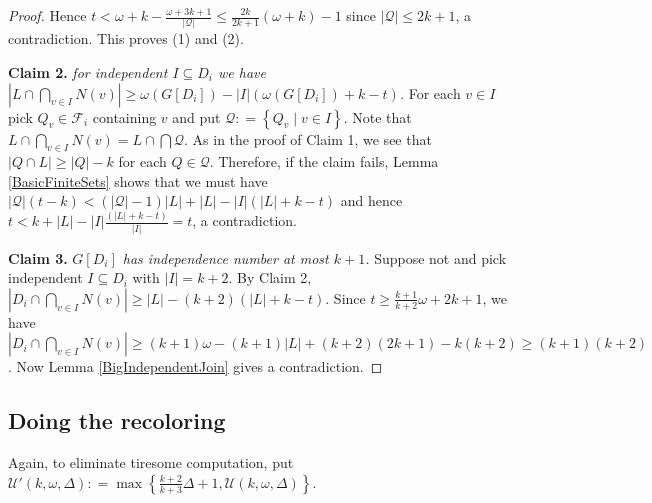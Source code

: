 \documentclass[12pt]{article}
\theoremstyle{plain}
\theoremstyle{definition}
\theoremstyle{remark}
\newcommand{\fancy}[1]{\mathcal{#1}}
\newcommand{\set}[1]{\left\{ #1 \right\}}
\newcommand{\setbs}[2]{\left\{ #1 \mid #2 \right\}}
\newcommand{\card}[1]{\left|#1\right|}
\newcommand{\DefinedAs}{\mathrel{\mathop:}=}
\begin{document}
\begin{proof}
Hence $t < \omega + k - \frac{\omega + 3k + 1}{\card{\fancy{Q}}} \leq \frac{2k}{2k+1}(\omega + k) - 1$ since $\card{\fancy{Q}} \leq 2k+1$, a contradiction.  This proves (1) and (2).

\textbf{Claim 2.} \textit{for independent $I \subseteq D_i$ we have $\card{L \cap \bigcap_{v \in I} N(v)} \geq \omega(G[D_i]) - \card{I}(\omega(G[D_i]) + k - t)$.}  For each $v \in I$ pick $Q_v \in \fancy{F}_i$ containing $v$ and put $\fancy{Q} \DefinedAs \setbs{Q_v}{v \in I}$. Note that $L \cap \bigcap_{v \in I} N(v) = L \cap \bigcap \fancy{Q}$.  As in the proof of Claim 1, we see that $\card{Q\cap L} \geq \card{Q} - k$ for each $Q \in \fancy{Q}$.  Therefore, if the claim fails, Lemma \ref{BasicFiniteSets} shows that we must have $\card{\fancy{Q}}(t-k) < (\card{\fancy{Q}} - 1)\card{L} + \card{L} - \card{I}(\card{L} + k - t)$ and hence $t < k + \card{L} - \card{I}\frac{(\card{L} + k - t)}{\card{I}} = t$, a contradiction.

\textbf{Claim 3.} \textit{$G[D_i]$ has independence number at most $k+1$.}  Suppose not and pick independent $I \subseteq D_i$ with $\card{I} = k+2$. By Claim 2, $\card{D_i \cap \bigcap_{v \in I} N(v)} \geq \card{L} - (k+2)(\card{L} + k - t)$.  Since $t \geq \frac{k+1}{k+2}\omega + 2k + 1$, we have $\card{D_i \cap \bigcap_{v \in I} N(v)} \geq (k+1)\omega - (k+1)\card{L} + (k+2)(2k+1) - k(k+2) \geq (k+1)(k+2)$.  Now Lemma \ref{BigIndependentJoin} gives a contradiction.
\end{proof}

\subsection{Doing the recoloring}

Again, to eliminate tiresome computation, put $\fancy{U}'(k, \omega, \Delta) \DefinedAs \max\set{\frac{k+2}{k+3}\Delta + 1, \fancy{U}(k, \omega, \Delta)}$.
\end{document}
